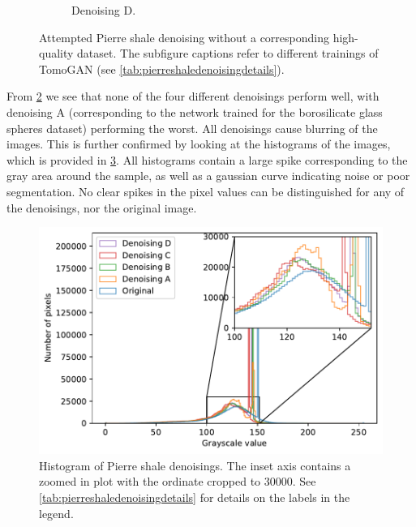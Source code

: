 \begin{figure}
\begin{subfigure}[t]{.45\textwidth}
    \caption{Denoising D. }
    \label{fig:shale:d}
  \end{subfigure}
  \caption[Attempted Pierre shale denoising without a corresponding high-quality dataset]{Attempted Pierre shale denoising without a corresponding high-quality dataset. The subfigure captions refer to different trainings of TomoGAN (see \cref{tab:pierreshaledenoisingdetails}). }
  \label{fig:shale}
\end{figure}

From \cref{fig:shale} we see that none of the four different denoisings perform well, with denoising A (corresponding to the network trained for the borosilicate glass spheres dataset) performing the worst. All denoisings cause blurring of the images. This is further confirmed by looking at the histograms of the images, which is provided in \cref{fig:shalehistogram}. All histograms contain a large spike corresponding to the gray area around the sample, as well as a gaussian curve indicating noise or poor segmentation. No clear spikes in the pixel values can be distinguished for any of the denoisings, nor the original image. 

\begin{figure}[htbp]
  \centering
  \includegraphics[width=.9\textwidth]{figures/shalehistogram.pdf}
  \caption[Histogram of Pierre shale denoisings]{Histogram of Pierre shale denoisings. The inset axis contains a zoomed in plot with the ordinate cropped to $30000$. See \cref{tab:pierreshaledenoisingdetails} for details on the labels in the legend. }
  \label{fig:shalehistogram}
\end{figure}

